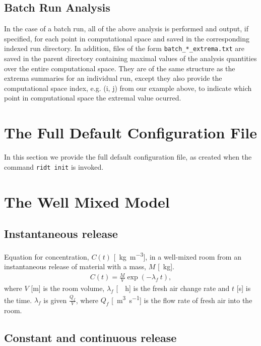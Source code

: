 \documentclass[]{article}
\def\code#1{\texttt{#1}}
\begin{document}
\subsection{Batch Run Analysis}
In the case of a batch run, all of the above analysis is performed and output,
if specified, for each point in computational space and saved in the
corresponding indexed run directory. In addition, files of the form
\code{batch\_*\_extrema.txt} are saved in the parent directory containing
maximal values of the analysis quantities over the entire computational space.
They are of the same structure as the extrema summaries for an individual run,
except they also provide the computational space index, e.g. (i, j) from our
example above, to indicate which point in computational space the extremal value
ocurred.



\appendix
\section{The Full Default Configuration File}\label{app:configfile}
In this section we provide the full default configuration file, as created when
the command \code{ridt init} is invoked.



\section{The Well Mixed Model}\label{app:wellmixed}




\subsection{Instantaneous release}\label{sec:WMInst}

Equation for concentration, $C(t)$ [\SI{}{\kilo\gram\per\meter\cubed}], in a
well-mixed room from an instantaneous release of material with a mass, $M$
[\SI{}{\kilo\gram}].
\begin{eqnarray}\label{eq:WMInst}
	C(t) = \frac{M}{V} \exp\left(-\lambda_f\:t\right),
\end{eqnarray}
where $V$ [m] is the room volume, $\lambda_f$ [\SI{}{\per\hour}] is the fresh
air change rate and $t$ [s] is the time. $\lambda_f$ is given $\frac{Q_f}{V}$,
where $Q_f$ [\SI{}{\meter\cubed\per\second}] is the flow rate of fresh air into
the room.
\subsection{Constant and continuous release}\label{sec:WMCont}
\end{document}
